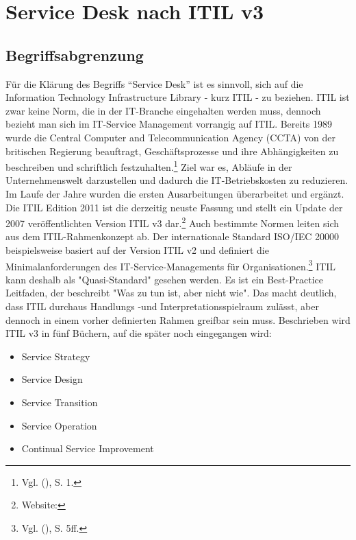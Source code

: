 \section{Service Desk nach ITIL v3}

\subsection{Begriffsabgrenzung}
\noindent Für die Klärung des Begriffs \enquote{Service Desk} ist es sinnvoll, sich auf die Information Technology Infrastructure Library - kurz ITIL - zu beziehen.
ITIL ist zwar keine Norm, die in der IT-Branche eingehalten werden muss, dennoch bezieht man sich im IT-Service Management vorrangig auf ITIL.
Bereits 1989 wurde die Central Computer and Telecommunication Agency (CCTA) von der britischen Regierung beauftragt, Geschäftsprozesse und ihre Abhängigkeiten zu beschreiben und schriftlich festzuhalten.\footnote{Vgl. \citeauthor{Olbrich} (\citeyear{Olbrich}), S. 1.}
Ziel war es, Abläufe in der Unternehmenswelt darzustellen und dadurch die IT-Betriebskosten zu reduzieren. Im Laufe der Jahre wurden die ersten Ausarbeitungen überarbeitet und ergänzt. Die ITIL Edition 2011 ist die derzeitig neuste Fassung und stellt ein Update der 2007 veröffentlichten Version ITIL v3 dar.\footnote{Website:\cite{Andenmatten}}
Auch bestimmte Normen leiten sich aus dem ITIL-Rahmenkonzept ab. Der internationale Standard ISO/IEC 20000 beispielsweise basiert auf der Version ITIL v2 und definiert die Minimalanforderungen des IT-Service-Managements für Organisationen.\footnote{Vgl. \citeauthor{Buchsein} (\citeyear{Buchsein}), S. 5ff.}
ITIL kann deshalb als "Quasi-Standard" gesehen werden. Es ist ein  Best-Practice Leitfaden, der beschreibt "Was zu tun ist, aber nicht wie". Das macht deutlich, dass ITIL durchaus Handlungs -und Interpretationsspielraum zulässt, aber dennoch in einem vorher definierten Rahmen greifbar sein muss. Beschrieben wird ITIL v3 in fünf Büchern, auf die später noch eingegangen wird:

\begin{itemize}
\item Service Strategy
\item Service Design
\item Service Transition
\item Service Operation
\item Continual Service Improvement
\end{itemize}

